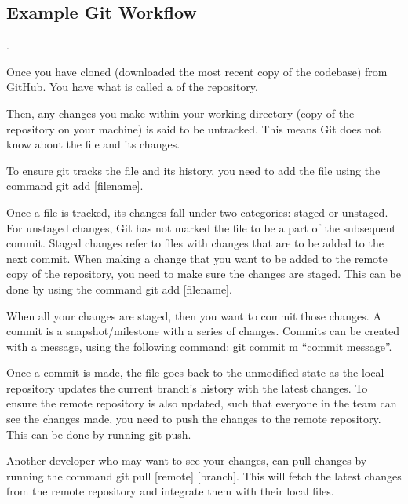 \documentclass[letterpaper,10pt,english]{jupyterBook}
\begin{document}
\subsection{Example Git Workflow}
\label{\detokenize{chapter_5/version_control:example-git-workflow}}
\sphinxAtStartPar
{}.

\sphinxAtStartPar
Once you have cloned (downloaded the most recent copy of the codebase)
from GitHub. You have what is called a  of the repository.

\sphinxAtStartPar
Then, any changes you make within your working directory (copy of the
repository on your machine) is said to be untracked. This means Git does
not know about the file and its changes.

\sphinxAtStartPar
To ensure git tracks the file and its history, you need to add the file
using the command git add {[}filename{]}.

\sphinxAtStartPar
Once a file is tracked, its changes fall under two categories: staged or
unstaged. For unstaged changes, Git has not marked the file to be a part
of the subsequent commit. Staged changes refer to files with changes
that are to be added to the next commit. When making a change that you
want to be added to the remote copy of the repository, you need to make
sure the changes are staged. This can be done by using the command git
add {[}filename{]}.

\sphinxAtStartPar
When all your changes are staged, then you want to commit those changes.
A commit is a snapshot/milestone with a series of changes. Commits can
be created with a message, using the following command: git commit \sphinxhyphen{}m
“commit message”.

\sphinxAtStartPar
Once a commit is made, the file goes back to the unmodified state as the
local repository updates the current branch’s history with the latest
changes. To ensure the remote repository is also updated, such that
everyone in the team can see the changes made, you need to push the
changes to the remote repository. This can be done by running git push.

\sphinxAtStartPar
Another developer who may want to see your changes, can pull changes by
running the command git pull {[}remote{]} {[}branch{]}. This will fetch the
latest changes from the remote repository and integrate them with their
local files.
\end{document}
